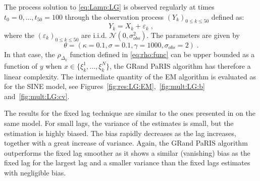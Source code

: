 \documentclass[12pt]{article}
\newcommand{\eqsp}{\;}
\newcommand{\1}{\mathrm{1}}
\begin{document}
The process solution to \eqref{eq:Lamp:LG} is observed regularly at times $t_0=0,\dots,t_{50}=100$ through the observation process $(Y_k)_{0\le k\le 50}$ defined as:
\begin{equation*}
Y_k = X_k + \varepsilon_k\eqsp,
\end{equation*}
where the $(\varepsilon_k)_{0\le k \le 50}$ are i.i.d. $ \mathcal{N}(0,\sigma^2_{obs})$.
The parameters are given by $$\theta =(\kappa=0.1,\sigma=0.1,\gamma=1000,\sigma_{obs} = 2)\eqsp.$$
In that case, the $\rho_{\Delta_k}$ function defined in \eqref{eq:rho:func} can be upper bounded as a function of $y$ when $x\in \{\xi_k^1,\dots, \xi_k^N\}$, the GRand PaRIS algorithm has therefore a linear complexity. 
The intermediate quantity of the EM algorithm is evaluated  as for the SINE model, see Figures~\ref{fig:res:LG:EM},~\ref{fig:mult:LG:b} and~\ref{fig:mult:LG:cv}.

The results for the fixed lag technique are similar to the ones presented in \cite[Figure 1]{olsson:strojby:2011} on the same model. 
For small lags, the variance of the estimates is small, but the estimation is highly biased. 
The bias rapidly decreases as the lag increases, together with a  great increase of variance.  
Again, the GRand PaRIS algorithm outperforms the fixed lag smoother as it shows  a similar (vanishing) bias as the fixed lag for the largest lag and a smaller variance than the fixed lags estimates with negligible bias. 
\end{document}
